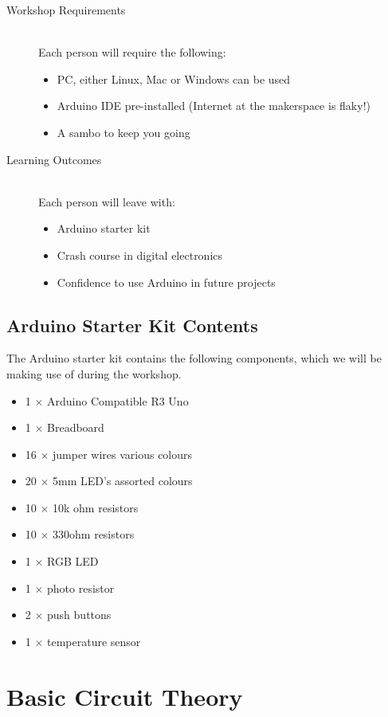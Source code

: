 \begin{description}
	\item[Workshop Requirements] \hfill \\
	Each person will require the following:
	\begin{itemize}
		\item PC, either Linux, Mac or Windows can be used
		\item Arduino IDE pre-installed (Internet at the makerspace is flaky!)
		\item A sambo to keep you going
	\end{itemize}
	
	\item[Learning Outcomes] \hfill \\
	Each person will leave with:
	\begin{itemize}
		\item Arduino starter kit
		\item Crash course in digital electronics
		\item Confidence to use Arduino in future projects
	\end{itemize}
\end{description}

\subsection*{Arduino Starter Kit Contents}
The Arduino starter kit contains the following components, which we will be making use of during the workshop.

\begin{itemize}
	\item 1 $\times$ Arduino Compatible R3 Uno
	\item 1 $\times$ Breadboard
	\item 16 $\times$ jumper wires various colours
	\item 20 $\times$ 5mm LED's assorted colours
	\item 10 $\times$ 10k ohm resistors
	\item 10 $\times$ 330ohm resistors
	\item 1 $\times$ RGB LED
	\item 1 $\times$ photo resistor
	\item 2 $\times$ push buttons
	\item 1 $\times$ temperature sensor
	
\end{itemize}


\newpage
\section*{Basic Circuit Theory}

